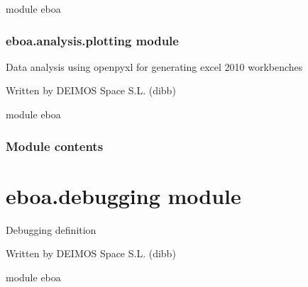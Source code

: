 module eboa

\begin{fulllineitems}
\label{\detokenize{eboa.analysis:eboa.analysis.functions.adjust_column_width}}
\end{fulllineitems}



\subsubsection{eboa.analysis.plotting module}
\label{\detokenize{eboa.analysis:module-eboa.analysis.plotting}}\label{\detokenize{eboa.analysis:eboa-analysis-plotting-module}}
Data analysis using openpyxl for generating excel 2010 workbenches

Written by DEIMOS Space S.L. (dibb)

module eboa

\begin{fulllineitems}
\label{\detokenize{eboa.analysis:eboa.analysis.plotting.generate_gantt}}
\end{fulllineitems}



\subsubsection{Module contents}
\label{\detokenize{eboa.analysis:module-eboa.analysis}}\label{\detokenize{eboa.analysis:module-contents}}

\section{eboa.debugging module}
\label{\detokenize{eboa:module-eboa.debugging}}\label{\detokenize{eboa:eboa-debugging-module}}
Debugging definition

Written by DEIMOS Space S.L. (dibb)

module eboa

